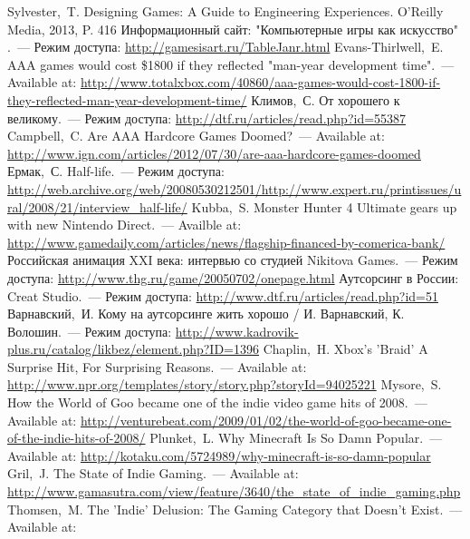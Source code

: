 \renewcommand{\bibname}{Список используемой литературы}
\begin{thebibliography}{10}
     Sylvester,~T. Designing Games: A Guide to Engineering Experiences. O'Reilly Media, 2013, 
        P. 416
     Информационный сайт: "Компьютерные игры как искусство" .~--- Режим доступа: 
        \url{http://gamesisart.ru/TableJanr.html}
     Evans-Thirlwell,~E. AAA games would cost \$1800 if they reflected "man-year development 
        time".~--- Available at: 
        \url{http://www.totalxbox.com/40860/aaa-games-would-cost-1800-if-they-reflected-man-year-development-time/}
     Климов,~С. От хорошего к великому.~--- Режим доступа: 
        \url{http://dtf.ru/articles/read.php?id=55387}
     Campbell,~C. Are AAA Hardcore Games Doomed?~--- Available at: 
        \url{http://www.ign.com/articles/2012/07/30/are-aaa-hardcore-games-doomed}
     Ермак,~С. Half-life.~--- Режим доступа: 
        \url{http://web.archive.org/web/20080530212501/http://www.expert.ru/printissues/ural/2008/21/interview_half-life/}
     Kubba,~S. Monster Hunter 4 Ultimate gears up with new Nintendo Direct.~--- Availble at: 
        \url{http://www.gamedaily.com/articles/news/flagship-financed-by-comerica-bank/}
     Российская анимация XXI века: интервью со студией Nikitova Games.~--- Режим доступа: 
        \url{http://www.thg.ru/game/20050702/onepage.html}
     Аутсорсинг в России: Creat Studio.~--- Режим доступа: 
        \url{http://www.dtf.ru/articles/read.php?id=51}
     Варнавский,~И. Кому на аутсорсинге жить хорошо / И. Варнавский, К. Волошин.~--- 
        Режим доступа: \url{http://www.kadrovik-plus.ru/catalog/likbez/element.php?ID=1396}
     Chaplin,~H. Xbox's 'Braid' A Surprise Hit, For Surprising Reasons.~--- Available at: 
        \url{http://www.npr.org/templates/story/story.php?storyId=94025221}
     Mysore,~S. How the World of Goo became one of the indie video game hits of 2008.~--- 
        Available at:
        \url{http://venturebeat.com/2009/01/02/the-world-of-goo-became-one-of-the-indie-hits-of-2008/}
     Plunket,~L. Why Minecraft Is So Damn Popular.~--- Available at: 
        \url{http://kotaku.com/5724989/why-minecraft-is-so-damn-popular}
     Gril,~J. The State of Indie Gaming.~--- Available at: 
        \url{http://www.gamasutra.com/view/feature/3640/the_state_of_indie_gaming.php}
     Thomsen,~M. The 'Indie' Delusion: The Gaming Category that Doesn't Exist.~--- Available at:

\end{thebibliography}
